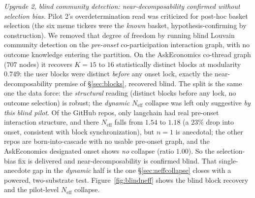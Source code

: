 \documentclass[11pt]{article}
\begin{document}
\emph{Upgrade 2, blind community detection: near-decomposability confirmed without selection bias.} Pilot 2's overdetermination read was criticized for post-hoc basket selection (the six meme tickers were the \emph{known} basket, hypothesis-confirming by construction). We removed that degree of freedom by running blind Louvain community detection on the \emph{pre-onset} co-participation interaction graph, with no outcome knowledge entering the partition. On the AskEconomics co-thread graph ($707$ nodes) it recovers $K=15$ to $16$ statistically distinct blocks at modularity $0.749$: the user blocks were distinct \emph{before} any onset lock, exactly the near-decomposability premise of \S\ref{sec:blocks}, recovered blind. The split is the same one the data force: the \emph{structural} reading (distinct blocks before any lock, no outcome selection) is robust; the \emph{dynamic} $N_{\mathrm{eff}}$ collapse was left only suggestive \emph{by this blind pilot}. Of the GitHub repos, only langchain had real pre-onset interaction structure, and there $N_{\mathrm{eff}}$ falls from $1.54$ to $1.18$ (a $23\%$ drop into onset, consistent with block synchronization), but $n=1$ is anecdotal; the other repos are born-into-cascade with no usable pre-onset graph, and the AskEconomics designated onset shows \emph{no} collapse (ratio $1.00$). So the selection-bias fix is delivered and near-decomposability is confirmed blind. That single-anecdote gap in the \emph{dynamic} half is the one \S\ref{sec:neffcollapse} closes with a powered, two-substrate test. Figure~\ref{fig:blindneff} shows the blind block recovery and the pilot-level $N_{\mathrm{eff}}$ collapse.
\end{document}
